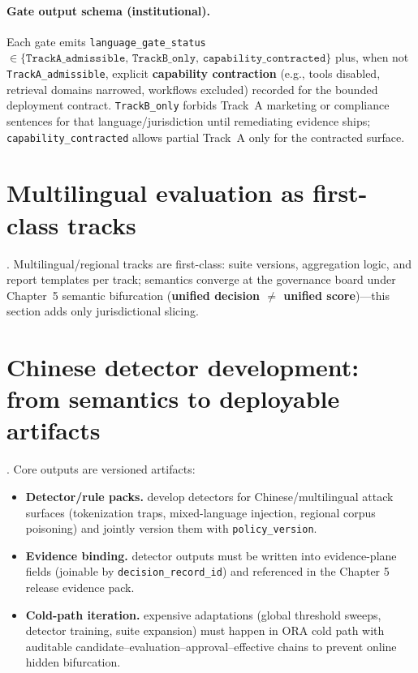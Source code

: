 \documentclass[11pt,a4paper]{report}
\begin{document}
\paragraph{Gate output schema (institutional).} Each gate emits \texttt{language\_gate\_status} \(\in \{\texttt{TrackA\_admissible},\,\texttt{TrackB\_only},\,\texttt{capability\_contracted}\}\) plus, when not \texttt{TrackA\_admissible}, explicit \textbf{capability contraction} (e.g., tools disabled, retrieval domains narrowed, workflows excluded) recorded for the bounded deployment contract. \texttt{TrackB\_only} forbids Track~A marketing or compliance sentences for that language/jurisdiction until remediating evidence ships; \texttt{capability\_contracted} allows partial Track~A only for the contracted surface.

\section{Multilingual evaluation as first-class tracks}
\EvalFramework{}. Multilingual/regional tracks are first-class: suite versions, aggregation logic, and report templates per track; semantics converge at the governance board under Chapter~5 semantic bifurcation (\textbf{unified decision \(\neq\) unified score})---this section adds only jurisdictional slicing.

\section{Chinese detector development: from semantics to deployable artifacts}
\ControlPlane{}. Core outputs are versioned artifacts:
\begin{itemize}
  \item \textbf{Detector/rule packs.} develop detectors for Chinese/multilingual attack surfaces (tokenization traps, mixed-language injection, regional corpus poisoning) and jointly version them with \texttt{policy\_version}.
  \item \textbf{Evidence binding.} detector outputs must be written into evidence-plane fields (joinable by \texttt{decision\_record\_id}) and referenced in the Chapter 5 release evidence pack.
  \item \textbf{Cold-path iteration.} expensive adaptations (global threshold sweeps, detector training, suite expansion) must happen in ORA cold path with auditable candidate–evaluation–approval–effective chains to prevent online hidden bifurcation.
\end{itemize}
\end{document}
